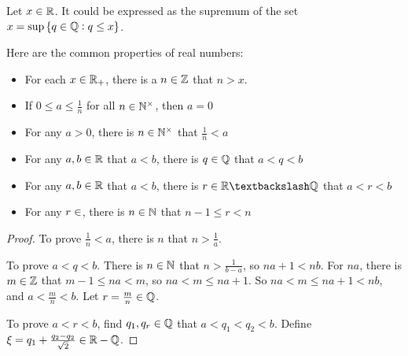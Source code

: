 \begin{theorem}
Let $x \in \mathbb{R}$. It could be expressed as the supremum of the set $x = \sup \set{q \in \mathbb{Q}: q \leq x}$.
\end{theorem}



\begin{theorem}
    Here are the common properties of real numbers:
    \begin{itemize}
        \item For each $x \in \mathbb{R}_{+}$, there is a $n \in \mathbb{Z}$ that $n > x$.
        \item If $\displaystyle 0 \leq a \leq \frac{1}{n}$ for all $n \in \mathbb{N}^{\times}$, then $a = 0$
        \item For any $a >0$, there is $n \in \mathbb{N}^{\times}$ that $\displaystyle \frac{1}{n} < a$
        \item For any $a,b\in \mathbb{R}$ that $a < b$, there is $q \in \mathbb{Q}$ that $a < q < b$
        \item For any $a,b\in \mathbb{R}$ that $a < b$, there is $r \in \realnumber \textbackslash \rational $ that $a < r < b$
        \item For any $r \in \real$, there is $n \in \mathbb{N}$ that $n - 1 \leq r < n$
    \end{itemize}    
\end{theorem}
\begin{proof}
    To prove $\frac{1}{n} < a$, there is $n$ that $n > \frac{1}{a}$. 
    
    To prove $a < q < b$. There is $n \in \mathbb{N}$ that $n > \frac{1}{b-a}$, so $na + 1 < nb$. For $na$, there is $m \in \mathbb{Z}$ that $m - 1 \leq na < m$, so $na < m \leq na + 1$. So $na < m \leq na + 1 < nb$, and $a < \frac{m}{n} < b$. Let $r = \frac{m}{n} \in \mathbb{Q}$.
    
    To prove $a < r < b$, find $q_1, q_r \in \mathbb{Q}$ that $a < q_1 < q_2 < b$. Define $\xi = q_1 + \frac{q_2 - q_2}{\sqrt{2}} \in \mathbb{R} - \mathbb{Q}$.
\end{proof}


